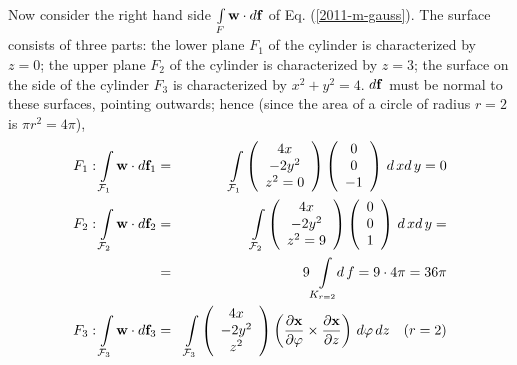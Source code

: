 {\begin{enumerate}
Now consider the right hand side $\int \limits_F {\bf w} \cdot d{\bf f}$
of Eq. (\ref{2011-m-gauss}).
The surface consists of three  parts:
the lower plane $F_1$ of the cylinder is characterized by $z=0$;
the upper plane $F_2$  of the cylinder is characterized by  $z=3$;
the surface on the side of the cylinder $F_3$
 is characterized by   $x^2+y^2=4$.
$d {\bf f}$ must be normal to these surfaces, pointing outwards; hence
(since the area of a circle of radius $r=2$ is $\pi r^2 = 4\pi$),
 \begin{eqnarray*}
  F_1 : \int \limits_{{\cal F}_1} {\bf w} \cdot d{\bf f}_1  & = &
    \int \limits_{{\cal F}_1}
    \left(
      \begin{array}{c}
        4x \\
        -2y^2 \\
        z^2=0
      \end{array}
    \right)
    \left(
      \begin{array}{c}
        0 \\
        0 \\
        -1
      \end{array}
    \right)
    \, d\, x d\, y = 0 \\
  F_2 : \int \limits_{{\cal F}_2} {\bf w} \cdot d{\bf f}_2 & = &
    \int \limits_{{\cal F}_2}
    \left(
      \begin{array}{c}
        4x \\
        -2y^2 \\
        z^2=9
      \end{array}
    \right)
    \left(
      \begin{array}{c}
        0 \\
        0 \\
        1
      \end{array}
    \right)
    \, d\, x d\, y = \\
  & = & 9 \int \limits_{K_{r=2}} \!\! d\, f=9 \cdot 4 \pi=36 \pi \\
  F_3 : \int \limits_{{\cal F}_3} {\bf w} \cdot d{\bf f}_3 & = &
    \int \limits_{{\cal F}_3}
    \left(
      \begin{array}{c}
        4x \\
        -2y^2 \\
        z^2
      \end{array}
    \right)
    \left(
      \frac{\partial {\bf x}}{\partial \varphi} \times
      \frac{\partial {\bf x}}{\partial z}
    \right)
    \, d\varphi \, dz \quad (r=2)
\end{eqnarray*}

\end{enumerate}}
